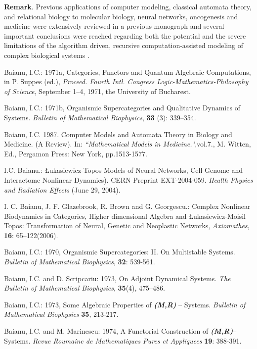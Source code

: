 \documentclass[12pt]{article}
\theoremstyle{plain}
\theoremstyle{definition}
\theoremstyle{plain}
\numberwithin{equation}{section}
\begin{document}
\textbf{Remark}. Previous applications of computer modeling, classical automata theory, and relational biology to molecular biology, neural networks, oncogenesis and medicine were extensively reviewed in a previous monograph and several important conclusions were reached regarding both the potential and the severe limitations of the algorithm driven, recursive computation-assisted modeling of complex biological systems \cite{ICB87}.


\begin{thebibliography}{9}

Baianu, I.C.: 1971a, Categories, Functors and Quantum Algebraic Computations, in P. Suppes (ed.), \emph{Proceed. Fourth Intl. Congress Logic-Mathematics-Philosophy of Science}, September 1--4, 1971, the University of Bucharest.

Baianu, I.C.: 1971b, Organismic Supercategories and Qualitative Dynamics of Systems. \emph{Bulletin of Mathematical Biophysics}, \textbf{33} (3): 339--354.

Baianu, I.C. 1987. Computer Models and Automata Theory in Biology and Medicine. (A Review). In:
\emph{``Mathematical Models in Medicine."},vol.7., M. Witten, Ed., Pergamon Press: New York,
 pp.1513-1577.

I.C. Baianu.: \L ukasiewicz-Topos Models of Neural Networks, Cell Genome and Interactome Nonlinear Dynamics). CERN Preprint EXT-2004-059. \textit{Health Physics and Radiation Effects} (June 29, 2004). 

I. C. Baianu, J. F. Glazebrook, R. Brown and G. Georgescu.: Complex Nonlinear Biodynamics in Categories, Higher dimensional Algebra and \L ukasiewicz-Moisil Topos: Transformation of Neural, Genetic and Neoplastic 
Networks, \emph{Axiomathes}, \textbf{16}: 65--122(2006).

Baianu, I.C.: 1970, Organismic Supercategories: II. On Multistable Systems. \emph{Bulletin of Mathematical Biophysics}, \textbf{32}: 539-561.

Baianu, I.C. and D. Scripcariu: 1973, On Adjoint Dynamical Systems. \emph{The Bulletin of Mathematical Biophysics}, \textbf{35}(4), 475--486.

Baianu, I.C.: 1973, Some Algebraic Properties of \emph{\textbf{(M,R)}} -- Systems. \emph{Bulletin of Mathematical Biophysics} \textbf{35}, 213-217.

Baianu, I.C. and M. Marinescu: 1974, A Functorial Construction of \emph{\textbf{(M,R)}}-- Systems. \emph{Revue Roumaine de Mathematiques Pures et Appliquees} \textbf{19}: 388-391.


\end{thebibliography}
\end{document}
